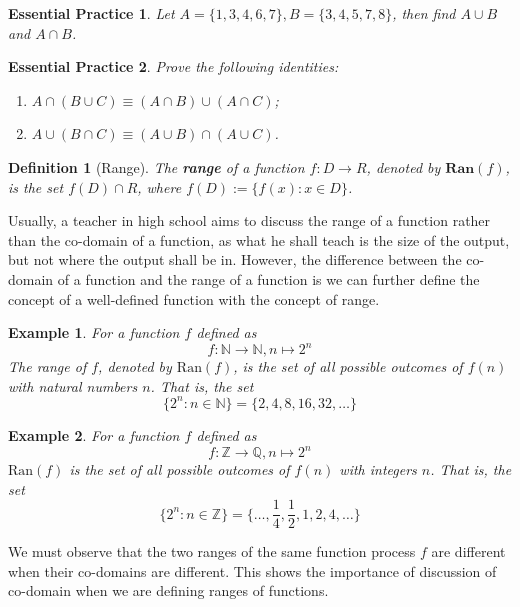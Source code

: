 \documentclass[12pt]{article}
\newtheorem{definition}{Definition}[section]
\newtheorem*{example}{Example}
\newtheorem{exercise}{Essential Practice}[subsubsection]
\begin{document}
    \begin{exercise}
        Let $A=\{1,3,4, 6, 7\}, B=\{3,4,5,7,8\}$, then find $A\cup B$ and $A\cap B$.
    \end{exercise}

    \begin{exercise}
        Prove the following identities:\begin{enumerate}
            \item $A\cap(B\cup C)\equiv (A\cap B)\cup(A\cap C)$;
            \item $A\cup(B\cap C)\equiv (A\cup B)\cap(A\cup C)$.
        \end{enumerate}
    \end{exercise}

    \begin{definition}[Range]
        The \textbf{range} of a function $f:D\to R$, denoted by $\mathbf{Ran}(f)$, is the set $f(D)\cap R$, where $f(D):=\{f(x):x\in D\}$.
    \end{definition}

    Usually, a teacher in high school aims to discuss the range of a function rather than the co-domain of a function, as what he shall teach is the size of the output, but not where the output shall be in. However, the difference between the co-domain of a function and the range of a function is we can further define the concept of a well-defined function with the concept of range.

    \begin{example}
        For a function $f$ defined as $$f:\mathbb{N}\to \mathbb{N}, n\mapsto 2^n$$ The range of $f$, denoted by $\mathrm{Ran}(f)$, is the set of all possible outcomes of $f(n)$ with natural numbers $n$. That is, the set $$\{2^n: n\in\mathbb{N}\}=\{2,4,8,16,32,\dots\}$$
    \end{example}

    \begin{example}
        For a function $f$ defined as $$f:\mathbb{Z}\to \mathbb{Q}, n\mapsto 2^n$$ $\mathrm{Ran}(f)$ is the set of all possible outcomes of $f(n)$ with integers $n$. That is, the set $$\{2^n: n\in\mathbb{Z}\}=\{\dots,\frac{1}{4},\frac{1}{2},1,2,4,\dots\}$$
    \end{example}

    We must observe that the two ranges of the same function process $f$ are different when their co-domains are different. This shows the importance of discussion of co-domain when we are defining ranges of functions.
\end{document}
